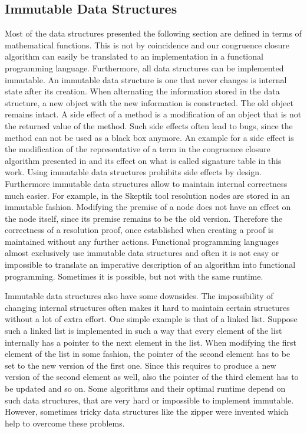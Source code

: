 \subsection*{Immutable Data Structures}

Most of the data structures presented the following section are defined in terms of mathematical functions.
This is not by coincidence and our congruence closure algorithm can easily be translated to an implementation in a functional programming language.
Furthermore, all data structures can be implemented immutable.
An immutable data structure is one that never changes is internal state after its creation.
When alternating the information stored in the data structure, a new object with the new information is constructed.
The old object remains intact.
A side effect of a method is a modification of an object that is not the returned value of the method.
Such side effects often lead to bugs, since the method can not be used as a black box anymore.
An example for a side effect is the modification of the representative of a term in the congruence closure algorithm presented in \cite{Fontaine2004} and its effect on what is called signature table in this work.
Using immutable data structures prohibits side effects by design.
Furthermore immutable data structures allow to maintain internal correctness much easier.
For example, in the Skeptik tool resolution nodes are stored in an immutable fashion.
Modifying the premise of a node does not have an effect on the node itself, since its premise remains to be the old version.
Therefore the correctness of a resolution proof, once established when creating a proof is maintained without any further actions.
Functional programming languages almost exclusively use immutable data structures and often it is not easy or impossible to translate an imperative description of an algorithm into functional programming.
Sometimes it is possible, but not with the same runtime.

Immutable data structures also have some downsides.
The impossibility of changing internal structures often makes it hard to maintain certain structures without a lot of extra effort.
One simple example is that of a linked list.
Suppose such a linked list is implemented in such a way that every element of the list internally has a pointer to the next element in the list.
When modifying the first element of the list in some fashion, the pointer of the second element has to be set to the new version of the first one.
Since this requires to produce a new version of the second element as well, also the pointer of the third element has to be updated and so on.
Some algorithms and their optimal runtime depend on such data structures, that are very hard or impossible to implement immutable.
However, sometimes tricky data structures like the zipper were invented which help to overcome these problems.

